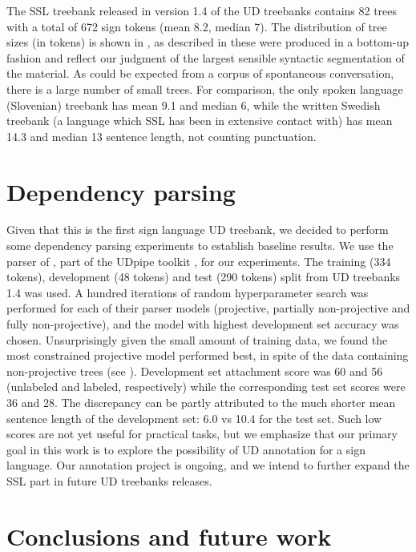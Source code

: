 \documentclass[11pt]{article}
\begin{document}
The SSL treebank released in version 1.4 of the UD treebanks
contains 82 trees with a total of 672 sign tokens (mean 8.2, median 7).
The distribution of tree sizes (in tokens) is shown in ,
as described in  these were produced in a bottom-up
fashion and reflect our judgment of the largest sensible syntactic
segmentation of the material.
As could be expected from a corpus of spontaneous conversation, there is a
large number of small trees. For comparison, the only spoken language
(Slovenian) treebank has
mean 9.1 and median 6, while the written Swedish treebank (a language which
SSL has been in extensive contact with) has mean 14.3 and median 13 sentence
length, not counting punctuation.

\section{Dependency parsing}

Given that this is the first sign language UD treebank, we decided to perform
some dependency parsing experiments to establish baseline results.
We use the parser of , part of the UDpipe
toolkit \cite{Straka2016udpipe}, for our experiments. The training (334
tokens), development (48 tokens) and test (290 tokens) split from
UD treebanks 1.4 was used.
A hundred iterations of random hyperparameter search was performed for each of
their parser models (projective, partially non-projective and fully
non-projective), and the model with highest development set accuracy was
chosen.
Unsurprisingly given the small amount of training data, we found the most
constrained projective model performed best, in spite of the data containing
non-projective trees (see ).
Development set attachment score was 60 and 56 (unlabeled and labeled,
respectively) while the corresponding test set scores were 36 and
28. The discrepancy can be partly attributed to the much shorter mean
sentence length of the development set: 6.0 vs 10.4 for the test set.
Such low scores are not yet useful for practical tasks, but we emphasize that
our primary goal in this work is to explore the possibility of UD annotation
for a sign language. Our annotation project is ongoing, and we intend to
further expand the SSL part in future UD treebanks releases.

\section{Conclusions and future work}
\end{document}
